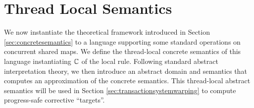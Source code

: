 \newcommand{\set}[1]{\mathsf{#1}}
\newcommand{\isSummary}{\set{isSummary}}
\newcommand{\freshNode}{\set{fresh}}
\newcommand{\heapnode}{\set{HeapNode}}
\newcommand{\reference}{\set{Ref}}
\newcommand{\variable}{\set{Var}}
\newcommand{\env}{\set{Env}}
\newcommand{\map}{\set{Map}}
\newcommand{\aset}[1]{\set{#1}}
\newcommand{\state}{\set{\Sigma}}
\newcommand{\aenv}{\aset{Env}}
\newcommand{\amap}{\aset{Map}}
\newcommand{\astate}{\aset{\Sigma}}
\newcommand{\multistate}{\set{\Phi}}
\newcommand{\amultistate}{\aset{\multistate}}
\newcommand{\serializedCFGs}{\set{serializedCFGs}}
\newcommand{\isconcrete}{\set{single}}
\newcommand{\warpdestination}{\set{corrTarg}}
\newcommand{\concretetransactions}{{\cal T}}
\newcommand{\abstracttransactions}{\concretetransactions^\#}

\section{Thread Local Semantics}
\label{se:instance}
We now instantiate the theoretical framework introduced in Section \ref{sec:concretesemantics} to a language supporting some standard operations on concurrent shared maps. We define the thread-local concrete semantics of this language instantiating $\mathbb{C}$ of the {\sf local} rule. Following standard abstract interpretation theory, we then introduce an abstract domain and semantics that computes an approximation of the concrete semantics. This thread-local abstract semantics will be used in Section \ref{sec:transactionsystemwarping} to compute progress-safe corrective ``targets''.


